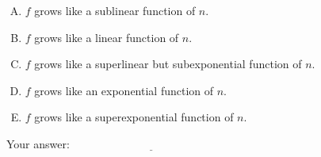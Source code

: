 \documentclass[10pt]{amsart}
\begin{document}
\begin{enumerate}
  \begin{enumerate}[(A)]
  \item $f$ grows like a sublinear function of $n$.
  \item $f$ grows like a linear function of $n$.
  \item $f$ grows like a superlinear but subexponential function of
    $n$.
  \item $f$ grows like an exponential function of $n$.
  \item $f$ grows like a superexponential function of $n$.
  \end{enumerate}

  \vspace{0.1in}
  Your answer: $\underline{\qquad\qquad\qquad\qquad\qquad\qquad\qquad}$
  \vspace{0.15in}

\end{enumerate}
\end{document}
